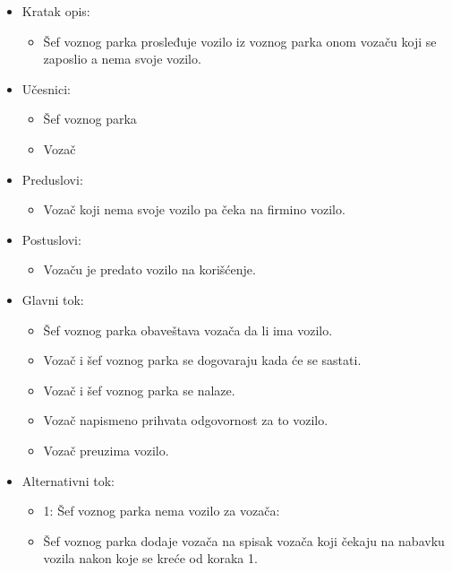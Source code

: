 \begin{itemize}
	\item Kratak opis:
		\begin{itemize}
			\item Šef voznog parka prosleđuje vozilo iz voznog parka onom vozaču koji se zaposlio a nema svoje vozilo.
		\end{itemize}

	\item Učesnici:
		\begin{itemize}
		    \item Šef voznog parka
			\item Vozač
		\end{itemize}


	\item Preduslovi:
		\begin{itemize}
		    \item Vozač koji nema svoje vozilo pa čeka na firmino vozilo.
		\end{itemize}


	\item Postuslovi:
		\begin{itemize}
			\item Vozaču je predato vozilo na korišćenje.
	\end{itemize}

	\item Glavni tok:
		\begin{itemize}
		    \item Šef voznog parka obaveštava vozača da li ima vozilo.
		    \item Vozač i šef voznog parka se dogovaraju kada će se sastati.
		    \item Vozač i šef voznog parka se nalaze.
			\item Vozač napismeno prihvata odgovornost za to vozilo.
			\item Vozač preuzima vozilo.
		\end{itemize}

	\item Alternativni tok:
		\begin{itemize}
		    \item 1: Šef voznog parka nema vozilo za vozača:
			\item Šef voznog parka dodaje vozača na spisak vozača koji čekaju na nabavku vozila nakon koje se kreće od koraka 1.
		\end{itemize}

\end{itemize}

